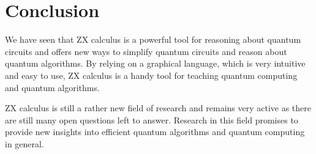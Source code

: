 \section{Conclusion}

We have seen that ZX calculus is a powerful tool for reasoning about quantum circuits and offers new ways to simplify quantum circuits and reason about quantum algorithms.
By relying on a graphical language, which is very intuitive and easy to use,
ZX calculus is a handy tool for teaching quantum computing and quantum algorithms.

ZX calculus is still a rather new field of research and remains very active as there are still many open questions left to answer. Research in this field promises to provide new insights into efficient quantum algorithms and quantum computing in general.